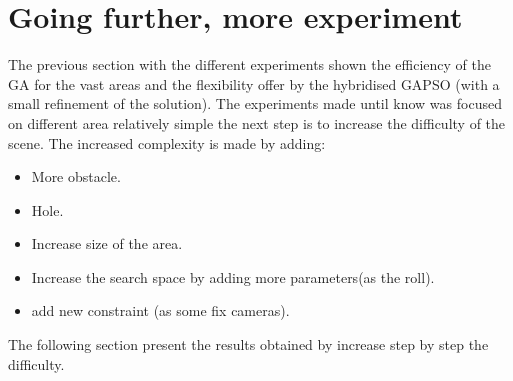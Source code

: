   
		
\section{Going further, more experiment }

The previous section with the different experiments shown the efficiency of the GA for the vast areas and the flexibility offer by the hybridised GAPSO (with a  small refinement of the solution). The experiments made until know was focused on different area relatively simple the next step is to increase the difficulty of the scene. The increased complexity is made by adding: 
\begin{itemize}
\item More obstacle.
\item Hole.
\item Increase size of the area.
\item Increase the search space by adding more parameters(as the roll). 
\item add new constraint (as  some fix cameras).
\end{itemize} 
The following section present the results obtained by increase step by step the difficulty. 

